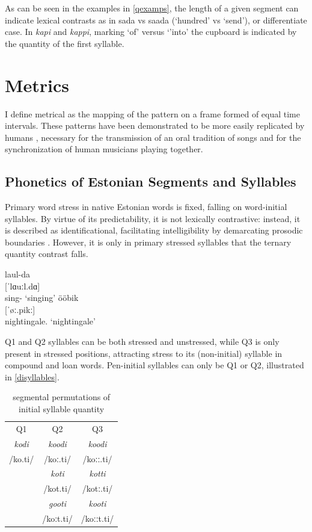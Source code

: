 As can be seen in the examples in \ref{qexamps}, the length of a given segment can indicate lexical contrasts as in sada vs saada (`hundred' vs `send'), or differentiate case. In {\it kapi} and {\it kappi}, marking `of' versus `'into' the cupboard is indicated by the quantity of the first syllable. 
\section{Metrics}

 I define metrical as the mapping of the pattern on a frame formed of equal time intervals. These patterns have been demonstrated to be more easily replicated by humans \citep{essensPovel1985}, necessary for the transmission of an oral tradition of songs and for the synchronization of human musicians playing together. 

\subsection{Phonetics of Estonian Segments and Syllables}


Primary word stress in native Estonian words is fixed, falling on word-initial syllables. By virtue of its predictability, it is not lexically contrastive: instead, it is described as identificational, facilitating intelligibility by demarcating prosodic boundaries \citep{lehiste1965, lehiste1978,lehiste1992, eekMeister1998, lippusAsuMari2014}. However, it is only in primary stressed syllables that the ternary quantity contrast falls. \begin{center}
\begin{exe}
\ex \gll laul-da \\
	{[ˈlɑuːl.dɑ]} \\
	sing-\Tr{} 
	\glt	`singing'
\ex 	\gll ööbik \\
	{[ˈøː.pikː]} \\
	nightingale.\Nom{} 
	\glt`nightingale'
\label{disyllables}
\end{exe}
\end{center}
Q1 and Q2 syllables can be both stressed and unstressed, while Q3 is only present in stressed positions, attracting stress to its (non-initial) syllable in compound and loan words. Pen-initial syllables can only be Q1 or Q2, illustrated in \ref{disyllables}. 

 \begin{table}[htb]
\centering
\begin{tabular}{ccc}
\hline
Q1 & Q2 & Q3 \\
{\it kodi	} 	& {\it koodi }	& {\it koodi }	\\  
/ko.ti/		& /koː.ti/	& /koːː.ti/	\\
\hline
		& {\it koti }	& {\it kotti}	 \\
		& /kot.ti/	& /kotː.ti/	\\
\hline
		& {\it gooti}	& {\it kooti} 	\\
		& /koːt.ti/	& /koːːt.ti/	\\
\hline
\end{tabular}
\label{qperm}
\caption{segmental permutations of initial syllable quantity}
\end{table}

